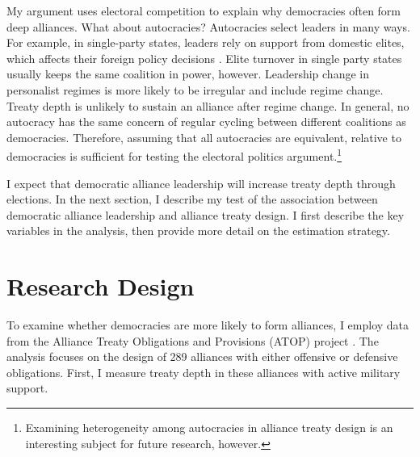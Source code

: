 \documentclass[12pt]{article}
\begin{document}
My argument uses electoral competition to explain why democracies often form deep alliances. 
What about autocracies? 
Autocracies select leaders in many ways. 
For example, in single-party states, leaders rely on support from domestic elites, which affects their foreign policy decisions \citep{Weeks2014}.
Elite turnover in single party states usually keeps the same coalition in power, however.  
Leadership change in personalist regimes is more likely to be irregular and include regime change.
Treaty depth is unlikely to sustain an alliance after regime change.  
In general, no autocracy has the same concern of regular cycling between different coalitions as democracies.
Therefore, assuming that all autocracies are equivalent, relative to democracies is sufficient for testing the electoral politics argument.\footnote{Examining heterogeneity among autocracies in alliance treaty design is an interesting subject for future research, however.} 


I expect that democratic alliance leadership will increase treaty depth through elections. 
In the next section, I describe my test of the association between democratic alliance leadership and alliance treaty design. 
I first describe the key variables in the analysis, then provide more detail on the estimation strategy.



\section{Research Design}



To examine whether democracies are more likely to form alliances, I employ data from the Alliance Treaty Obligations and Provisions (ATOP) project \citep{Leedsetal2002}. 
The analysis focuses on the design of 289 alliances with either offensive or defensive obligations.
First, I measure treaty depth in these alliances with active military support. 
\end{document}
